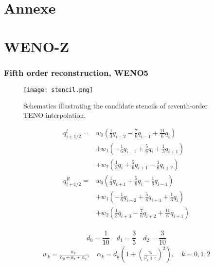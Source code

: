 \section{Annexe}
\section{WENO-Z}
\subsubsection{Fifth order reconstruction, WENO5}\label{sssec:weno5}

\begin{figure}[H]
 \centering %

 \texttt{[image: stencil.png]}
 \caption{Schematics illustrating the candidate stencils of seventh-order  TENO interpolation.}
 \label{fig:sample}
\end{figure}

\begin{equation}
\begin{aligned}
q_{i+1 / 2}^{l}=& w_{0}\left(\frac{1}{3} q_{i-2}-\frac{7}{6} q_{i-1}+\frac{11}{6} q_{i}\right) \\
&+w_{1}\left(-\frac{1}{6} q_{i-1}+\frac{5}{6} q_{i}+\frac{1}{3} q_{i+1}\right) \\
&+w_{2}\left(\frac{1}{3} q_{i}+\frac{5}{6} q_{i+1}-\frac{1}{6} q_{i+2}\right) \\
q_{i+1 / 2}^{R}=& w_{0}\left(\frac{1}{3} q_{i+1}+\frac{5}{6} q_{i}-\frac{1}{6} q_{i-1}\right) \\
&+w_{1}\left(-\frac{1}{6} q_{i+2}+\frac{5}{6} q_{i+1}+\frac{1}{3} q_{i}\right) \\
&+w_{2}\left(\frac{1}{3} q_{i+3}-\frac{7}{6} q_{i+2}+\frac{11}{6} q_{i+1}\right)
\end{aligned}
\end{equation}\\

$$d_0=\frac{1}{10} \quad d_1=\frac{3}{5} \quad d_2=\frac{3}{10}$$
\begin{equation}
\begin{array}{l}
w_{k}=\frac{\alpha_{k}}{\alpha_{0}+\alpha_{1}+\alpha_{2}}, \quad \alpha_{k}=d_k\left(1+\left(\frac{\tau_5}{\beta_{k}+\epsilon}\right)^2\right), \quad k=0,1,2\\
\end{array}
\end{equation}

